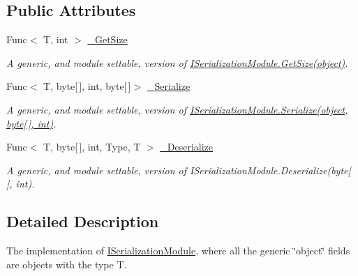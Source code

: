 \subsection*{Public Attributes}
\begin{DoxyCompactItemize}
\item 
Func$<$ T, int $>$ \hyperlink{class_skyrates_1_1_common_1_1_network_1_1_bit_serialize_attribute_1_1_serialization_module_3_01_t_01_4_a1ac40d798659fb55e0bd153fe44397e5}{\-\_\-\-Get\-Size}
\begin{DoxyCompactList}\small\item\em A generic, and module settable, version of \hyperlink{interface_skyrates_1_1_common_1_1_network_1_1_bit_serialize_attribute_1_1_i_serialization_module_a25a42bb4dde0dda3e028c84ad010a4ad}{I\-Serialization\-Module.\-Get\-Size(object)}. \end{DoxyCompactList}\item 
Func$<$ T, byte\mbox{[}$\,$\mbox{]}, int, byte\mbox{[}$\,$\mbox{]}$>$ \hyperlink{class_skyrates_1_1_common_1_1_network_1_1_bit_serialize_attribute_1_1_serialization_module_3_01_t_01_4_a89379102ea2486d5d82cc83ebf459c74}{\-\_\-\-Serialize}
\begin{DoxyCompactList}\small\item\em A generic, and module settable, version of \hyperlink{interface_skyrates_1_1_common_1_1_network_1_1_bit_serialize_attribute_1_1_i_serialization_module_abeca6d8c99338fc36671f58541001624}{I\-Serialization\-Module.\-Serialize(object, byte\mbox{[}$\,$\mbox{]}, int)}. \end{DoxyCompactList}\item 
Func$<$ T, byte\mbox{[}$\,$\mbox{]}, int, Type, T $>$ \hyperlink{class_skyrates_1_1_common_1_1_network_1_1_bit_serialize_attribute_1_1_serialization_module_3_01_t_01_4_a9ba0dad82d69332a68e96f79fbb45387}{\-\_\-\-Deserialize}
\begin{DoxyCompactList}\small\item\em A generic, and module settable, version of I\-Serialization\-Module.\-Deserialize(byte\mbox{[}$\,$\mbox{]}, int). \end{DoxyCompactList}\end{DoxyCompactItemize}


\subsection{Detailed Description}
The implementation of \hyperlink{interface_skyrates_1_1_common_1_1_network_1_1_bit_serialize_attribute_1_1_i_serialization_module}{I\-Serialization\-Module}, where all the generic \char`\"{}object\char`\"{} fields are objects with the type T. 



